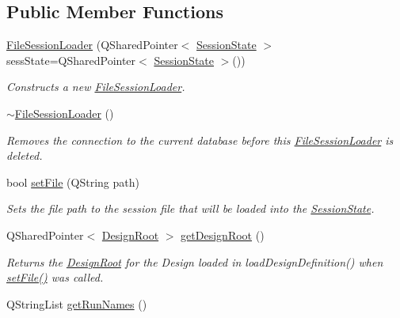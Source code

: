 \subsection*{Public Member Functions}
\begin{DoxyCompactItemize}
\item 
\hyperlink{class_picto_1_1_file_session_loader_a82cacad5592e06a8aa399cf3db6daea7}{File\-Session\-Loader} (Q\-Shared\-Pointer$<$ \hyperlink{class_picto_1_1_session_state}{Session\-State} $>$ sess\-State=Q\-Shared\-Pointer$<$ \hyperlink{class_picto_1_1_session_state}{Session\-State} $>$())
\begin{DoxyCompactList}\small\item\em Constructs a new \hyperlink{class_picto_1_1_file_session_loader}{File\-Session\-Loader}. \end{DoxyCompactList}\item 
\hypertarget{class_picto_1_1_file_session_loader_a9f28fba3c0be58a4d6397e7d3f6b13ca}{\hyperlink{class_picto_1_1_file_session_loader_a9f28fba3c0be58a4d6397e7d3f6b13ca}{$\sim$\-File\-Session\-Loader} ()}\label{class_picto_1_1_file_session_loader_a9f28fba3c0be58a4d6397e7d3f6b13ca}

\begin{DoxyCompactList}\small\item\em Removes the connection to the current database before this \hyperlink{class_picto_1_1_file_session_loader}{File\-Session\-Loader} is deleted. \end{DoxyCompactList}\item 
\hypertarget{class_picto_1_1_file_session_loader_a6a9035fea225651a072550cf6e315b9c}{bool \hyperlink{class_picto_1_1_file_session_loader_a6a9035fea225651a072550cf6e315b9c}{set\-File} (Q\-String path)}\label{class_picto_1_1_file_session_loader_a6a9035fea225651a072550cf6e315b9c}

\begin{DoxyCompactList}\small\item\em Sets the file path to the session file that will be loaded into the \hyperlink{class_picto_1_1_session_state}{Session\-State}. \end{DoxyCompactList}\item 
Q\-Shared\-Pointer$<$ \hyperlink{class_picto_1_1_design_root}{Design\-Root} $>$ \hyperlink{class_picto_1_1_file_session_loader_ab9186678a41bd08b7ec73502537a53b4}{get\-Design\-Root} ()
\begin{DoxyCompactList}\small\item\em Returns the \hyperlink{class_picto_1_1_design_root}{Design\-Root} for the Design loaded in load\-Design\-Definition() when \hyperlink{class_picto_1_1_file_session_loader_a6a9035fea225651a072550cf6e315b9c}{set\-File()} was called. \end{DoxyCompactList}\item 
\hypertarget{class_picto_1_1_file_session_loader_a594062ade9010399ea05e273387ef9d9}{Q\-String\-List \hyperlink{class_picto_1_1_file_session_loader_a594062ade9010399ea05e273387ef9d9}{get\-Run\-Names} ()}\label{class_picto_1_1_file_session_loader_a594062ade9010399ea05e273387ef9d9}


\end{DoxyCompactItemize}
